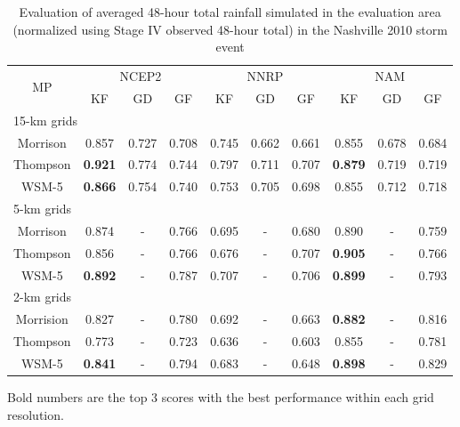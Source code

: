 \begin{table}[htbp]
	\centering
	\caption{Evaluation of averaged 48-hour total rainfall simulated in the evaluation area (normalized using Stage IV observed 48-hour total) in the Nashville 2010 storm event}
	\begin{threeparttable}
		\begin{tabular}{cccccccccc}
			\hline
			\multirow{2}{*}{MP} &\multicolumn{3}{c}{NCEP2} & \multicolumn{3}{c}{NNRP}  & \multicolumn{3}{c}{NAM}\\
			\cline{2-10}
			&KF & GD & GF  & KF & GD & GF & KF & GD & GF\\
			\hline
			\multicolumn{10}{l}{15-km grids}\\
			Morrison & 0.857 & 0.727 & 0.708 & 0.745 & 0.662 & 0.661 & 0.855 & 0.678 & 0.684\\
			Thompson & \textbf{0.921} & 0.774 & 0.744 & 0.797 & 0.711 & 0.707 & \textbf{0.879} & 0.719 & 0.719\\
			WSM-5    & \textbf{0.866} & 0.754 & 0.740 & 0.753 & 0.705 & 0.698 & 0.855 & 0.712 & 0.718\\
			\hline
			\multicolumn{10}{l}{5-km grids}\\
			Morrison & 0.874 & - & 0.766 & 0.695 & - & 0.680 & 0.890 & - & 0.759\\
			Thompson & 0.856 & - & 0.766 & 0.676 & - & 0.707 & \textbf{0.905} & - & 0.766\\
			WSM-5 & \textbf{0.892} & - & 0.787 & 0.707 & - & 0.706 & \textbf{0.899} & - & 0.793\\
			\hline
			\multicolumn{10}{l}{2-km grids}\\
			Morrision & 0.827 & - & 0.780 & 0.692 & - & 0.663 & \textbf{0.882} & - & 0.816\\
			Thompson & 0.773 & - & 0.723 & 0.636 & - & 0.603 & 0.855 & - & 0.781\\
			WSM-5 & \textbf{0.841} & - & 0.794 & 0.683 & - & 0.648 & \textbf{0.898} & - & 0.829\\
			\hline
			
		\end{tabular}	
		\begin{tablenotes}
			\small
			\item  Bold numbers are the top 3 scores with the best performance within each grid resolution.
		\end{tablenotes}
	\end{threeparttable}
	\label{table:2-3}
\end{table}

